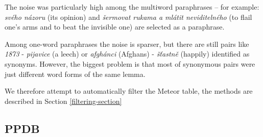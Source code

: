 The noise was particularly high among the multiword paraphrases -- for example: \textit{svého názoru} 
(its opinion) and \textit{šermovat rukama a mlátit neviditelného} (to flail one's arms and to beat 
the invisible one) are selected as a paraphrase. 

Among one-word paraphrases the noise is sparser, but there are still pairs like \textit{1873} - 
\textit{pijavice} (a leech) or \textit{afgh\'{a}nci} (Afghans) - \textit{š\v{t}astně} (happily) 
identified as synonyms. However, the biggest problem is that most of synonymous pairs were just 
different word forms of the same lemma. 

We therefore attempt to automatically filter the Meteor table, the methods are described in Section 
\ref{filtering-section}

\subsection{PPDB} 